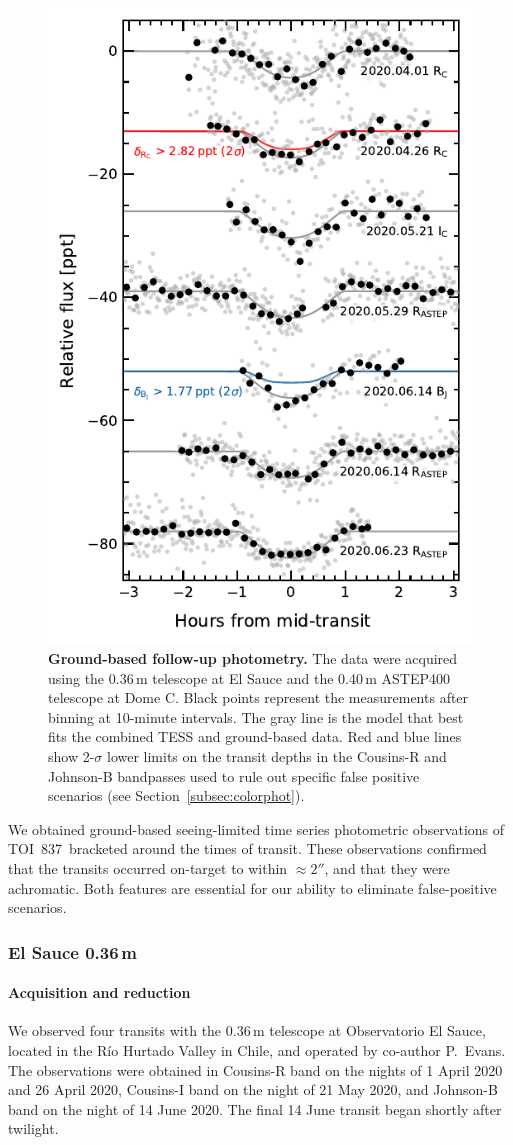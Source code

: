 \documentclass[12pt,twocolumn,tighten]{aastex63}
\newcommand{\tn}{TOI~837} %
\begin{document}
\begin{figure}[!t]
	\begin{center}
		\leavevmode
		\includegraphics[width=.48\textwidth]{f4.pdf}
	\end{center}
	\vspace{-0.7cm}
	\caption{
    {\bf Ground-based follow-up photometry.} The data were acquired
    using the 0.36$\,$m telescope at El Sauce and the 0.40$\,$m
    ASTEP400 telescope at Dome C.  Black points represent the
    measurements after binning at 10-minute intervals. The gray line
    is the model that best fits the combined TESS and ground-based
    data.  Red and blue lines show 2-$\sigma$ lower limits on the
    transit depths in the Cousins-R and Johnson-B bandpasses used to
    rule out specific false positive scenarios (see
    Section~\ref{subsec:colorphot}).
		\label{fig:groundphot}
	}
\end{figure}

We obtained ground-based seeing-limited time series photometric
observations of \tn\ bracketed around the times of transit.  These
observations confirmed that the transits occurred on-target to within
$\approx 2''$, and that they were achromatic. Both features are
essential for our ability to eliminate false-positive scenarios.

\subsubsection{El Sauce 0.36$\,$m}

\paragraph{Acquisition and reduction}
We observed four transits with the 0.36$\,$m telescope at Observatorio
El Sauce, located in the R\'io Hurtado Valley in Chile, and operated
by co-author P{.}~Evans.  The observations were obtained in Cousins-R
band on the nights of 1 April 2020 and 26 April 2020, Cousins-I band
on the night of 21 May 2020, and Johnson-B band on the night of 14
June 2020.  The final 14 June transit began shortly after twilight.
\end{document}
